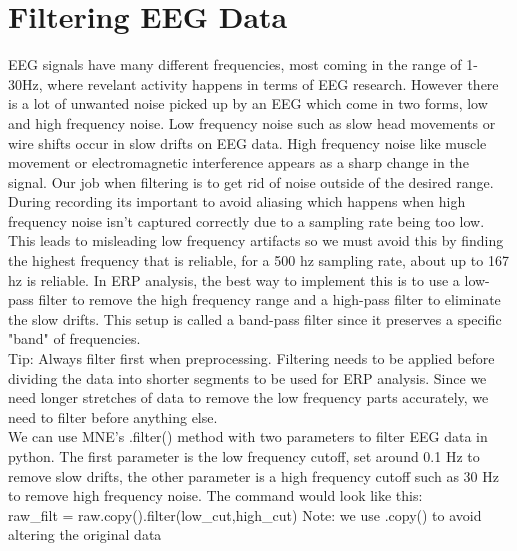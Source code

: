 \documentclass{article}
\begin{document}
\section{Filtering EEG Data}
EEG signals have many different frequencies, most coming in the range of 1-30Hz, where revelant activity happens in terms of EEG research. However there is a lot of unwanted noise picked up by an EEG which come in two forms, low and high frequency noise. Low frequency noise such as slow head movements or wire shifts occur in slow drifts on EEG data. High frequency noise like muscle movement or electromagnetic interference appears as a sharp change in the signal. Our job when filtering is to get rid of noise outside of the desired range. \\
During recording its important to avoid aliasing which happens when high frequency noise isn't captured correctly due to a sampling rate being too low. This leads to misleading low frequency artifacts so we must avoid this by finding the highest frequency that is reliable, for a 500 hz sampling rate, about up to 167 hz is reliable. In ERP analysis, the best way to implement this is to use a low-pass filter to remove the high frequency range and a high-pass filter to eliminate the slow drifts. This setup is called a band-pass filter since it preserves a specific "band" of frequencies. \\
Tip: Always filter first when preprocessing. Filtering needs to be applied before dividing the data into shorter segments to be used for ERP analysis. Since we need longer stretches of data to remove the low frequency parts accurately, we need to filter before anything else.\\
We can use MNE's .filter() method with two parameters to filter EEG data in python. The first parameter is the low frequency cutoff, set around 0.1 Hz to remove slow drifts, the other parameter is a high frequency cutoff such as 30 Hz to remove high frequency noise. The command would look like this:\\
raw\_filt = raw.copy().filter(low\_cut,high\_cut) Note: we use .copy() to avoid altering the original data \\
\end{document}

